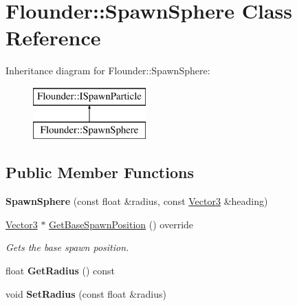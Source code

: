 \hypertarget{class_flounder_1_1_spawn_sphere}{}\section{Flounder\+:\+:Spawn\+Sphere Class Reference}
\label{class_flounder_1_1_spawn_sphere}
Inheritance diagram for Flounder\+:\+:Spawn\+Sphere\+:\begin{figure}[H]
\begin{center}
\leavevmode
\includegraphics[height=2.000000cm]{class_flounder_1_1_spawn_sphere}
\end{center}
\end{figure}
\subsection*{Public Member Functions}
\begin{DoxyCompactItemize}
\item 
\mbox{\label{class_flounder_1_1_spawn_sphere_a86bafb42b583aa5045ff35ce35ff9aae}} 
{\bfseries Spawn\+Sphere} (const float \&radius, const \hyperlink{class_flounder_1_1_vector3}{Vector3} \&heading)
\item 
\hyperlink{class_flounder_1_1_vector3}{Vector3} $\ast$ \hyperlink{class_flounder_1_1_spawn_sphere_aed154e6e7cf50de491fa881e952dc487}{Get\+Base\+Spawn\+Position} () override
\begin{DoxyCompactList}\small\item\em Gets the base spawn position. \end{DoxyCompactList}\item 
\mbox{\label{class_flounder_1_1_spawn_sphere_a307e57c132eaf903e151595e044e7efa}} 
float {\bfseries Get\+Radius} () const
\item 
\mbox{\label{class_flounder_1_1_spawn_sphere_ab770a65c591cdbfc70aab532ae06b21f}} 
void {\bfseries Set\+Radius} (const float \&radius)
\end{DoxyCompactItemize}
